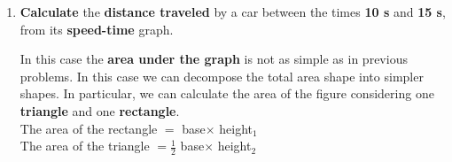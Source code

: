 \documentclass[A4,12pt]{article}
\begin{document}
\begin{enumerate}[label=\bfseries (\arabic*)]
\item \textbf{Calculate} the \textbf{distance traveled} by a car between the times \textbf{10 s} and \textbf{15 s}, from its \textbf{speed-time} graph. \cite{Triguero}
%
\begin{figure}[H]
    \centering
    \end{figure}
%
%
\begin{example}
In this case the \textbf{area under the graph} is not as simple as in previous problems. In this case we can decompose the total area shape into simpler shapes. In particular, we can calculate the area of the figure considering one \textbf{triangle} and one \textbf{rectangle}.\\

The area of the rectangle $=$ base$\times$ height$_1$\\

The area of the triangle $=\frac{1}{2}$ base$\times$ height$_2$\\


\end{example}
\end{enumerate}
\end{document}
